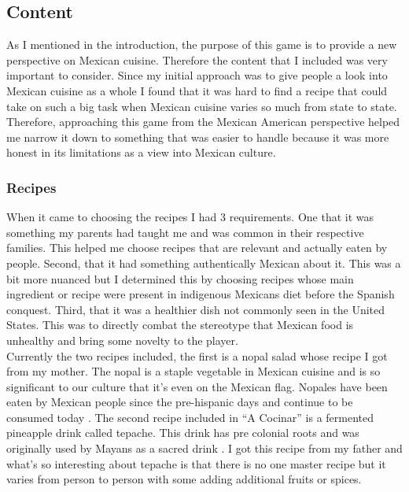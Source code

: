 \documentclass[10pt,twocolumn]{article}
\begin{document}
\subsection{Content}
As I mentioned in the introduction, the purpose of this game is to provide a new perspective on Mexican cuisine. Therefore the content that I included was very important to consider. Since my initial approach was to give people a look into Mexican cuisine as a whole I found that it was hard to find a recipe that could take on such a big task when Mexican cuisine varies so much from state to state. Therefore, approaching this game from the Mexican American perspective helped me narrow it down to something that was easier to handle because it was more honest in its limitations as a view into Mexican culture.

\subsubsection{Recipes}
When it came to choosing the recipes I had 3 requirements. One that it was something my parents had taught me and was common in their respective families. This helped me choose recipes that are relevant and actually eaten by people. Second, that it had something authentically Mexican about it. This was a bit more nuanced but I determined this by choosing recipes whose main ingredient or recipe were present in indigenous Mexicans diet before the Spanish conquest. Third, that it was a healthier dish not commonly seen in the United States. This was to directly combat the stereotype that Mexican food is unhealthy and bring some novelty to the player.  
\\
Currently the two recipes included, the first is a nopal salad whose recipe I got from my mother. The nopal is a staple vegetable in Mexican cuisine and is so significant to our culture that it’s even on the Mexican flag. Nopales have been eaten by Mexican people since the pre-hispanic days and continue to be consumed today \cite{cacti2002}. The second recipe included in “A Cocinar'' is a fermented pineapple drink called tepache. This drink has pre colonial roots and was originally used by Mayans as a sacred drink \cite{tepache2021}. I got this recipe from my father and what's so interesting about tepache is that there is no one master recipe but it varies from person to person with some adding additional fruits or spices. 
\end{document}
